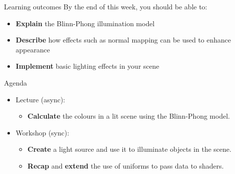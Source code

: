 \begin{frame}{Learning outcomes}
	By the end of this week, you should be able to:
	\begin{itemize}
		\item \textbf{Explain} the Blinn-Phong illumination model
		\item \textbf{Describe} how effects such as normal mapping can be used to enhance appearance
		\item \textbf{Implement} basic lighting effects in your scene
	\end{itemize}
\end{frame}

\begin{frame}{Agenda}
	\begin{itemize}
		\pause\item Lecture (async):
		\begin{itemize}
			\item \textbf{Calculate} the colours in a lit scene using the Blinn-Phong model.
		\end{itemize}
		\pause\item Workshop (sync):
		\begin{itemize}
			\item \textbf{Create} a light source and use it to illuminate objects in the scene.
			\item \textbf{Recap} and \textbf{extend} the use of uniforms to pass data to shaders.
		\end{itemize}
	\end{itemize}
\end{frame}